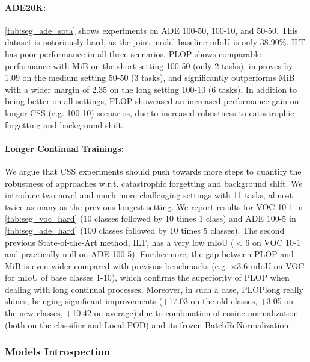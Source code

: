 \paragraph{ADE20K:} \autoref{tab:seg_ade_sota} shows experiments on ADE 100-50, 100-10, and
50-50. This dataset is notoriously hard, as the joint model baseline \ac{mIoU} is only 38.90\%. ILT
has poor performance in all three scenarios. PLOP shows comparable performance with MiB on the short
setting 100-50 (only 2 tasks), improves by 1.09 \pp on the medium setting 50-50 (3 tasks),
and significantly outperforms MiB with a wider margin of 2.35 \pp on the long setting
100-10 (6 tasks). In addition to being better on all settings, PLOP showcased an increased
performance gain on longer \ac{CSS} (e.g. 100-10) scenarios, due to increased robustness to catastrophic
forgetting and background shift.


\paragraph{Longer Continual Trainings:}We argue that \ac{CSS} experiments should push towards
more steps
\citep{wortsman2020supermasks,lomonaco2020ar1,douillard2020podnet,castro2018end_to_end_inc_learn} to
quantify the robustness of approaches w.r.t. catastrophic forgetting and background shift. We
introduce two novel and much more challenging settings with 11 tasks, almost twice as many as the
previous longest setting. We report results for VOC 10-1 in \autoref{tab:seg_voc_hard} (10 classes
followed by 10 times 1 class) and ADE 100-5 in \autoref{tab:seg_ade_hard} (100 classes followed by
10 times 5 classes). The second previous State-of-the-Art method, ILT, has a very low \ac{mIoU}
($<6$ on VOC 10-1 and practically null on ADE 100-5). Furthermore, the gap between PLOP and MiB is
even wider compared with previous benchmarks (e.g. $\times$3.6 \ac{mIoU} on VOC for \ac{mIoU} of
base classes 1-10), which confirms the superiority of PLOP when dealing with long continual
processes. Moreover, in such a case, PLOPlong really shines, bringing significant improvements
(+17.03 \pp on the old classes, +3.05 \pp on the new classes, +10.42 \pp on average) due to
combination of cosine normalization (both on the classifier and Local POD) and its frozen
BatchReNormalization.

\subsubsection{Models Introspection}

